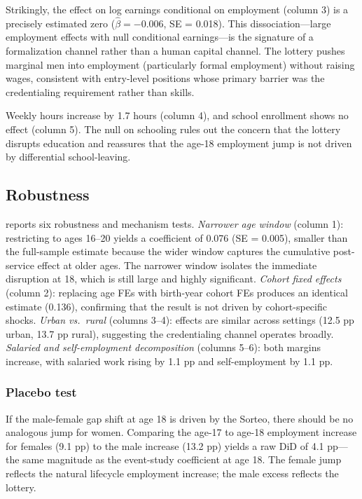 \documentclass[12pt]{article}
\begin{document}
Strikingly, the effect on log earnings conditional on employment (column 3) is a precisely estimated zero ($\hat{\beta} = -0.006$, SE = 0.018). This dissociation---large employment effects with null conditional earnings---is the signature of a formalization channel rather than a human capital channel. The lottery pushes marginal men into employment (particularly formal employment) without raising wages, consistent with entry-level positions whose primary barrier was the credentialing requirement rather than skills.

Weekly hours increase by 1.7 hours (column 4), and school enrollment shows no effect (column 5). The null on schooling rules out the concern that the lottery disrupts education and reassures that the age-18 employment jump is not driven by differential school-leaving.



\subsection{Robustness}

 reports six robustness and mechanism tests. \textit{Narrower age window} (column 1): restricting to ages 16--20 yields a coefficient of 0.076 (SE = 0.005), smaller than the full-sample estimate because the wider window captures the cumulative post-service effect at older ages. The narrower window isolates the immediate disruption at 18, which is still large and highly significant. \textit{Cohort fixed effects} (column 2): replacing age FEs with birth-year cohort FEs produces an identical estimate (0.136), confirming that the result is not driven by cohort-specific shocks. \textit{Urban vs.\ rural} (columns 3--4): effects are similar across settings (12.5 pp urban, 13.7 pp rural), suggesting the credentialing channel operates broadly. \textit{Salaried and self-employment decomposition} (columns 5--6): both margins increase, with salaried work rising by 1.1 pp and self-employment by 1.1 pp.



\subsubsection*{Placebo test} If the male-female gap shift at age 18 is driven by the Sorteo, there should be no analogous jump for women. Comparing the age-17 to age-18 employment increase for females (9.1 pp) to the male increase (13.2 pp) yields a raw DiD of 4.1 pp---the same magnitude as the event-study coefficient at age 18. The female jump reflects the natural lifecycle employment increase; the male excess reflects the lottery.
\end{document}
